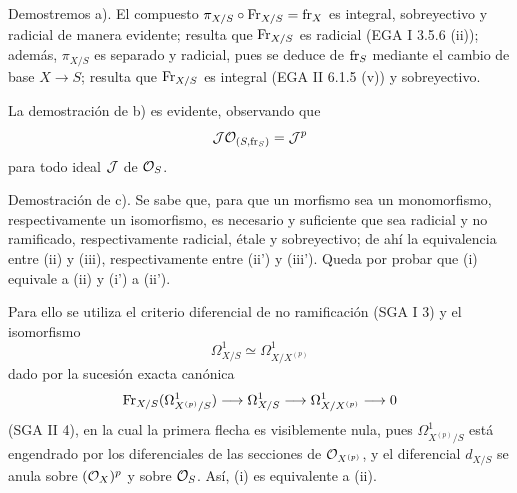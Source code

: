 Demostremos a). El compuesto $\pi_{X/S}\circ\operatorname{Fr}_{X/S}=\operatorname{fr}_X$ es integral, sobreyectivo y radicial de manera evidente; resulta que $\operatorname{Fr}_{X/S}$ es radicial (EGA I 3.5.6 (ii)); además, $\pi_{X/S}$ es separado y radicial, pues se deduce de $\operatorname{fr}_S$ mediante el cambio de base $X\to S$; resulta que $\operatorname{Fr}_{X/S}$ es integral (EGA II 6.1.5 (v)) y sobreyectivo.

La demostración de b) es evidente, observando que
\[
\mathcal J\mathcal{O}_{(S,\operatorname{fr}_S)}=\mathcal J^p
\]
para todo ideal $\mathcal J$ de $\mathcal{O}_S$.

Demostración de c). Se sabe que, para que un morfismo sea un monomorfismo, respectivamente un isomorfismo, es necesario y suficiente que sea radicial y no ramificado, respectivamente radicial, étale y sobreyectivo; de ahí la equivalencia entre (ii) y (iii), respectivamente entre (ii') y (iii'). Queda por probar que (i) equivale a (ii) y (i') a (ii').

Para ello se utiliza el criterio diferencial de no ramificación (SGA I 3) y el isomorfismo
\[
\Omega^1_{X/S}\simeq \Omega^1_{X/X^{(p)}}
\]
dado por la sucesión exacta canónica
\[
\operatorname{Fr}_{X/S}(\Omega^1_{X^{(p)}/S})\longrightarrow \Omega^1_{X/S}
\longrightarrow \Omega^1_{X/X^{(p)}}\longrightarrow 0
\]
(SGA II 4), en la cual la primera flecha es visiblemente nula, pues $\Omega^1_{X^{(p)}/S}$ está engendrado por los diferenciales de las secciones de $\mathcal{O}_{X^{(p)}}$, y el diferencial $d_{X/S}$ se anula sobre $(\mathcal{O}_X)^p$ y sobre $\mathcal{O}_S$. Así, (i) es equivalente a (ii).
